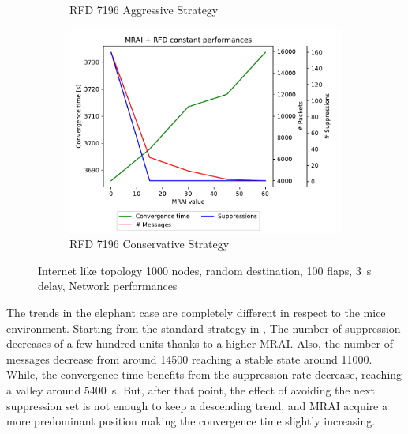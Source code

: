 \begin{figure}[h]
\begin{subfigure}[b]{0.49\textwidth}
         \caption{RFD 7196 Aggressive Strategy}
         \label{fig:1000_7196RFDA_multiMRAI_elephants}
     \end{subfigure}
     \begin{subfigure}[b]{0.49\textwidth}
         \centering
         \includegraphics[width=\textwidth]{images/RFD/miceVSelephants/MultiMRAI/elephants/cisco_1000_RFD_7196_conservative-constant_mrai_rfd_evolution.pdf}
         \caption{RFD 7196 Conservative Strategy}
         \label{fig:1000_7196RFDC_multiMRAI_elephants}
     \end{subfigure}
		\caption{Internet like topology \num{1000} nodes, random destination, \num{100} flaps, \SI{3}{\second} delay, Network performances}
        \label{fig:1000_RFD_multiMRAI_elephants}
\end{figure}

The trends in the elephant case are completely different in respect to the
mice environment.
Starting from the standard strategy in ,
The number of suppression decreases of a few hundred units
thanks to a higher \ac{MRAI}.
Also, the number of messages decrease from around \num{14500} reaching a stable
state around \num{11000}.
While, the convergence time benefits from the suppression rate decrease, reaching
a valley around \SI{5400}{\second}.
But, after that point, the effect of avoiding the next suppression set is not enough to keep
a descending trend, and \ac{MRAI} acquire a more predominant position making
the convergence time slightly increasing.

